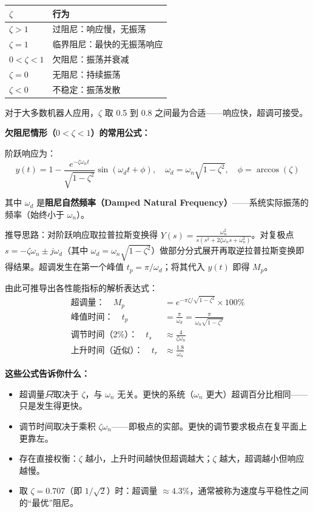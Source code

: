 \begin{center}
\begin{tabular}{ll}
\toprule
$\zeta$ & \textbf{行为} \\
\midrule
$\zeta > 1$ & 过阻尼：响应慢，无振荡 \\
$\zeta = 1$ & 临界阻尼：最快的无振荡响应 \\
$0 < \zeta < 1$ & 欠阻尼：振荡并衰减 \\
$\zeta = 0$ & 无阻尼：持续振荡 \\
$\zeta < 0$ & 不稳定：振荡发散 \\
\bottomrule
\end{tabular}
\end{center}

对于大多数机器人应用，$\zeta$ 取 0.5 到 0.8 之间最为合适——响应快，超调可接受。

\textbf{欠阻尼情形（$0 < \zeta < 1$）的常用公式：}

阶跃响应为：
\begin{equation}
y(t) = 1 - \frac{e^{-\zeta\omega_n t}}{\sqrt{1 - \zeta^2}} \sin\left(\omega_d t + \phi\right), \quad \omega_d = \omega_n\sqrt{1 - \zeta^2}, \quad \phi = \arccos(\zeta)
\end{equation}

其中 $\omega_d$ 是\textbf{阻尼自然频率（Damped Natural Frequency）}——系统实际振荡的频率（始终小于 $\omega_n$）。

推导思路：对阶跃响应取拉普拉斯变换得 $Y(s) = \frac{\omega_n^2}{s(s^2 + 2\zeta\omega_n s + \omega_n^2)}$。对复极点 $s = -\zeta\omega_n \pm j\omega_d$（其中 $\omega_d = \omega_n\sqrt{1-\zeta^2}$）做部分分式展开再取逆拉普拉斯变换即得结果。超调发生在第一个峰值 $t_p = \pi/\omega_d$；将其代入 $y(t)$ 即得 $M_p$。

由此可推导出各性能指标的解析表达式：
\begin{align}
\text{超调量：} \quad M_p &= e^{-\pi\zeta / \sqrt{1-\zeta^2}} \times 100\% \\
\text{峰值时间：} \quad t_p &= \frac{\pi}{\omega_d} = \frac{\pi}{\omega_n\sqrt{1-\zeta^2}} \\
\text{调节时间（2\%）：} \quad t_s &\approx \frac{4}{\zeta\omega_n} \\
\text{上升时间（近似）：} \quad t_r &\approx \frac{1.8}{\omega_n}
\end{align}

\textbf{这些公式告诉你什么：}
\begin{itemize}
    \item 超调量\textit{只}取决于 $\zeta$，与 $\omega_n$ 无关。更快的系统（$\omega_n$ 更大）超调百分比相同——只是发生得更快。
    \item 调节时间取决于乘积 $\zeta\omega_n$——即极点的实部。更快的调节要求极点在复平面上更靠左。
    \item 存在直接权衡：$\zeta$ 越小，上升时间越快但超调越大；$\zeta$ 越大，超调越小但响应越慢。
    \item 取 $\zeta = 0.707$（即 $1/\sqrt{2}$）时：超调量 $\approx 4.3\%$，通常被称为速度与平稳性之间的``最优''阻尼。
\end{itemize}


